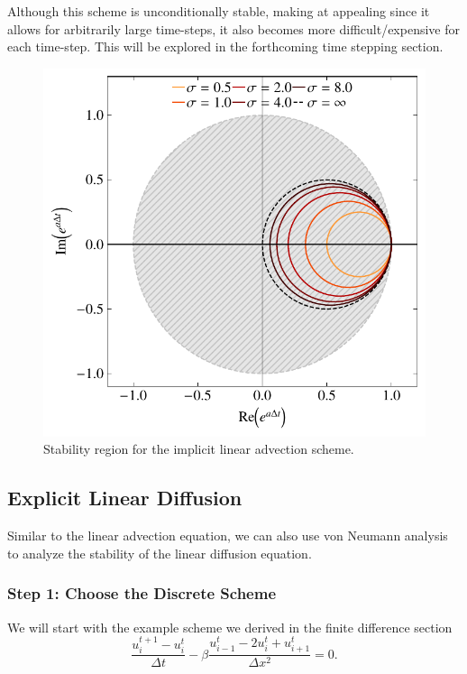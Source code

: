 \begin{remark}
Although this scheme is unconditionally stable, making at appealing since it allows for arbitrarily large time-steps, it also becomes more difficult/expensive for each time-step. This will be explored in the forthcoming time stepping section.
\end{remark}

\begin{figure}[htbp]
	\centering
	\includegraphics[width=0.6\linewidth]{Pictures/ch12_implicit_advection}
	\caption{Stability region for the implicit linear advection scheme.}
	\label{fig:implicit_advection}
\end{figure}

\subsection{Explicit Linear Diffusion}
Similar to the linear advection equation, we can also use von Neumann analysis to analyze the stability of the linear diffusion equation. 

\subsubsection{Step 1: Choose the Discrete Scheme}
We will start with the example scheme we derived in the finite difference section
\begin{equation}
  \frac{u_i^{t+1} - u_{i}^t}{\Delta t} - \beta \frac{u_{i-1}^t - 2u_i^t + u_{i+1}^t}{\Delta x^2} = 0.
\end{equation}


